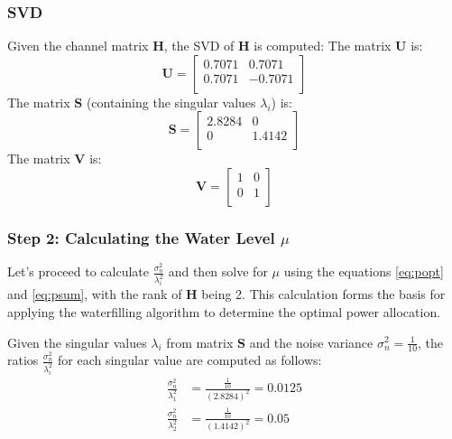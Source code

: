 \documentclass[lettersize,journal]{IEEEtran}
\begin{document}
\subsubsection{SVD}
Given the channel matrix \( \mathbf{H} \), the SVD of \( \mathbf{H} \) is computed:
The matrix \( \mathbf{U} \) is:
\begin{equation}
\mathbf{U} = \begin{bmatrix}
0.7071 & 0.7071 \\
0.7071 & -0.7071 \\
\end{bmatrix}
\end{equation}
The matrix \( \mathbf{S} \) (containing the singular values \( \lambda_i \)) is:
\begin{equation}
\mathbf{S} = \begin{bmatrix}
2.8284 & 0 \\
0 & 1.4142 \\
\end{bmatrix}
\end{equation}
The matrix \( \mathbf{V} \) is:
\begin{equation}
\mathbf{V} = \begin{bmatrix}
1 & 0 \\
0 & 1 \\
\end{bmatrix}
\end{equation}

\subsubsection{Step 2: Calculating the Water Level \( \mu \)}
Let's proceed to calculate \( \frac{\sigma_n^2}{\lambda_i^2} \) and then solve for \( \mu \) using the equations \eqref{eq:popt} and \eqref{eq:psum}, with the rank of \( \mathbf{H} \) being 2. This calculation forms the basis for applying the waterfilling algorithm to determine the optimal power allocation.

Given the singular values \( \lambda_i \) from matrix \( \mathbf{S} \) and the noise variance \( \sigma_n^2 = \frac{1}{10} \), the ratios \( \frac{\sigma_n^2}{\lambda_i^2} \) for each singular value are computed as follows:
\begin{equation}
\begin{aligned}
\frac{\sigma_n^2}{\lambda_1^2} &= \frac{\frac{1}{10}}{(2.8284)^2} = 0.0125 \\
\frac{\sigma_n^2}{\lambda_2^2} &= \frac{\frac{1}{10}}{(1.4142)^2} = 0.05
\end{aligned}
\end{equation}
\end{document}
